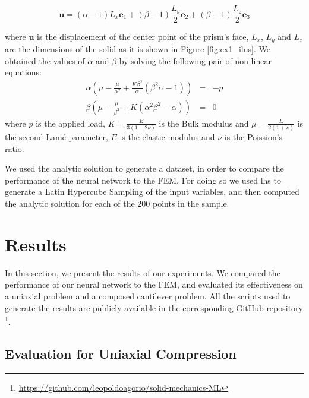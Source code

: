 \documentclass[oneside,a4paper,english,links]{amca}
\begin{document}
\begin{equation}
\label{eq:analytic_solution}
\boldsymbol{u} = 
(\alpha - 1)L_x \boldsymbol{e}_1 
+   
(\beta - 1) \frac{L_y}{2}  \boldsymbol{e}_2 
+   
(\beta - 1)\frac{L_z}{2} \boldsymbol{e}_3 
\end{equation}

where $\boldsymbol{u}$ is the displacement of the center point of the prism's face, $L_x$, $L_y$ and $L_z$ are the dimensions of the solid as it is shown in Figure \ref{fig:ex1_ilus}. We obtained the values of $\alpha$ and $\beta$ by solving the following pair of non-linear equations:
%
\begin{eqnarray}
\alpha \left( 
\mu -  \frac{\mu}{\alpha^2} + \frac{K\beta^2}{\alpha} (\beta^2 \alpha -1)  
\right) &=& - p \\
\beta \left( 
	\mu -  \frac{\mu}{\beta^2} + K (\alpha^2\beta^2 - \alpha) 
 \right) &=& 0
\end{eqnarray}
%
where  $p$ is the applied load, $K = \frac{E}{3(1 - 2\nu)}$ is the Bulk modulus and $\mu = \frac{E}{2(1 + \nu)}$ is the second Lamé parameter, $E$ is the elastic modulus and $\nu$ is the Poission's ratio. 


We used the analytic solution to generate a dataset, in order to compare the performance of the neural network to the FEM. For doing so we used lhs to generate a Latin Hypercube Sampling \citep{stein1987large} of the input variables, and then computed the analytic solution for each of the 200 points in the sample.


\section{Results}

In this section, we present the results of our experiments. We compared the performance of our neural network to the FEM, and evaluated its effectiveness on a uniaxial problem and a composed cantilever problem. All the scripts used to generate the results are publicly available in the corresponding \href{https://github.com/leopoldoagorio/solid-mechanics-ML}{ GitHub repository} \footnote{\href{https://github.com/leopoldoagorio/solid-mechanics-ML}{ https://github.com/leopoldoagorio/solid-mechanics-ML} }.

\subsection{Evaluation for Uniaxial Compression}
\end{document}

